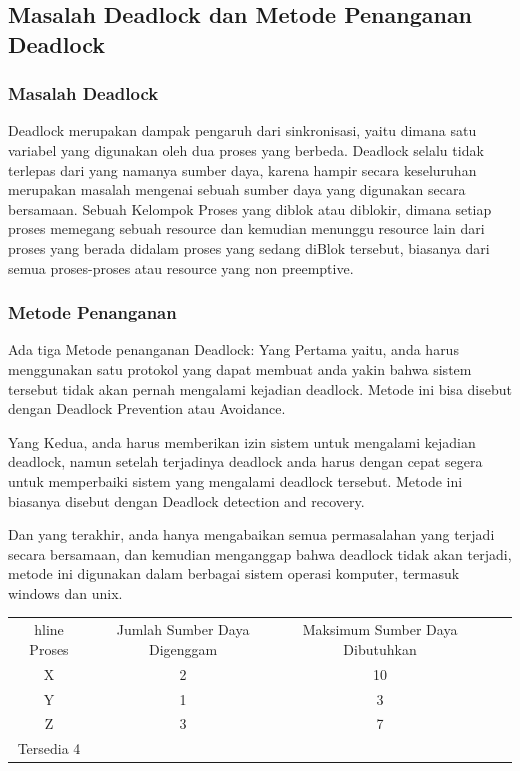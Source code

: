 \subsection {Masalah Deadlock dan Metode Penanganan Deadlock}
\subsubsection {Masalah Deadlock}
	Deadlock merupakan dampak pengaruh dari sinkronisasi, yaitu dimana satu variabel yang digunakan oleh dua proses yang berbeda. Deadlock selalu tidak terlepas dari yang namanya sumber daya, karena hampir secara keseluruhan merupakan masalah mengenai sebuah sumber daya yang digunakan secara bersamaan. Sebuah Kelompok Proses yang diblok atau diblokir, dimana setiap proses memegang sebuah resource dan kemudian menunggu resource lain dari proses yang berada didalam proses yang sedang diBlok tersebut, biasanya dari semua proses-proses atau resource yang non preemptive.
	
\subsubsection {Metode Penanganan}
	Ada tiga Metode penanganan Deadlock:
	Yang Pertama yaitu, anda harus menggunakan satu protokol yang dapat membuat anda yakin bahwa sistem tersebut tidak akan pernah mengalami kejadian deadlock. Metode ini bisa disebut dengan Deadlock Prevention atau Avoidance.
	
	Yang Kedua, anda harus memberikan izin sistem untuk mengalami kejadian deadlock, namun setelah terjadinya deadlock anda harus dengan cepat segera untuk memperbaiki sistem yang mengalami deadlock tersebut. Metode ini biasanya disebut dengan Deadlock detection and recovery.
	
	Dan yang terakhir, anda hanya mengabaikan semua permasalahan yang terjadi secara bersamaan, dan kemudian menganggap bahwa deadlock tidak akan terjadi, metode ini digunakan dalam berbagai sistem operasi komputer, termasuk windows dan unix.

\begin{table}[H]
\begin{tabular}{|c|c|c|c|c|}
hline
Proses & Jumlah Sumber Daya Digenggam & Maksimum Sumber Daya Dibutuhkan\\

X   & 2 & 10\\
Y   & 1 & 3\\
Z   & 3 & 7\\

Tersedia 4  &  &\\

\end{tabular}
\end{table}


